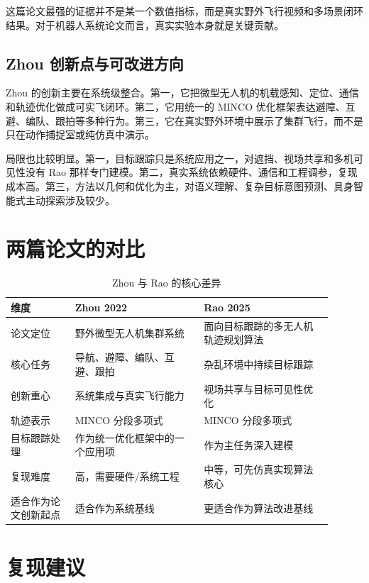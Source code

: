 ﻿\documentclass[UTF8,a4paper,11pt]{ctexart}
\begin{document}
这篇论文最强的证据并不是某一个数值指标，而是真实野外飞行视频和多场景闭环结果。对于机器人系统论文而言，真实实验本身就是关键贡献。

\subsection{Zhou 创新点与可改进方向}

Zhou 的创新主要在系统级整合。第一，它把微型无人机的机载感知、定位、通信和轨迹优化做成可实飞闭环。第二，它用统一的 MINCO 优化框架表达避障、互避、编队、跟拍等多种行为。第三，它在真实野外环境中展示了集群飞行，而不是只在动作捕捉室或纯仿真中演示。

局限也比较明显。第一，目标跟踪只是系统应用之一，对遮挡、视场共享和多机可见性没有 Rao 那样专门建模。第二，真实系统依赖硬件、通信和工程调参，复现成本高。第三，方法以几何和优化为主，对语义理解、复杂目标意图预测、具身智能式主动探索涉及较少。

\section{两篇论文的对比}

\begin{table}[H]
\centering
\caption{Zhou 与 Rao 的核心差异}
\begin{tabular}{p{0.18\linewidth}p{0.36\linewidth}p{0.36\linewidth}}
\toprule
维度 & Zhou 2022 & Rao 2025 \\
\midrule
论文定位 & 野外微型无人机集群系统 & 面向目标跟踪的多无人机轨迹规划算法 \\
核心任务 & 导航、避障、编队、互避、跟拍 & 杂乱环境中持续目标跟踪 \\
创新重心 & 系统集成与真实飞行能力 & 视场共享与目标可见性优化 \\
轨迹表示 & MINCO 分段多项式 & MINCO 分段多项式 \\
目标跟踪处理 & 作为统一优化框架中的一个应用项 & 作为主任务深入建模 \\
复现难度 & 高，需要硬件/系统工程 & 中等，可先仿真实现算法核心 \\
适合作为论文创新起点 & 适合作为系统基线 & 更适合作为算法改进基线 \\
\bottomrule
\end{tabular}
\end{table}

\section{复现建议}
\end{document}
